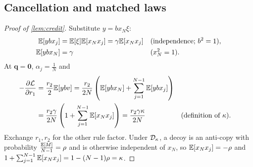 \subsection{Cancellation and matched laws}
\label{app:credit-proof}
\begin{proof}[Proof of \cref{lem:credit}]
Substitute $y=b x_N\xi$:
\begin{align*}
 \mathbb E[y b x_j]&=\mathbb E[\xi]\mathbb E[x_N x_j]=\gamma\mathbb E[x_N x_j]
 &&\text{(independence; $b^2=1$)},\\
 \mathbb E[y b x_N]&=\gamma
 &&\text{($x_N^2=1$)}.
\end{align*}
At $\bm q=\bm0$, $\alpha_j=\tfrac{1}{N}$ and
\begin{align*}
 -\frac{\partial \mathcal L}{\partial r_1}
 &=\frac{r_2}{2}\mathbb E[y b v]
 =\frac{r_2}{2N}\left(\mathbb E[y b x_N]+\sum_{j=1}^{N-1}\mathbb E[y b x_j]\right)\\
 &=\frac{r_2\gamma}{2N}\left(1+\sum_{j=1}^{N-1}\mathbb E[x_N x_j]\right)
 =\frac{r_2\gamma \kappa}{2N}&&\text{(definition of $\kappa$)}.
\end{align*}
Exchange $r_1,r_2$ for the other rule factor.
Under $\mathcal D_{\kappa}$, a decoy is an anti-copy with probability $\tfrac{\mathbb E[M]}{N-1}=\rho$ and is otherwise independent of $x_N$, so
$\mathbb E[x_N x_j]=-\rho$ and $1+\sum_{j=1}^{N-1}\mathbb E[x_N x_j]=1-(N-1)\rho=\kappa$.\qedhere
\end{proof}

